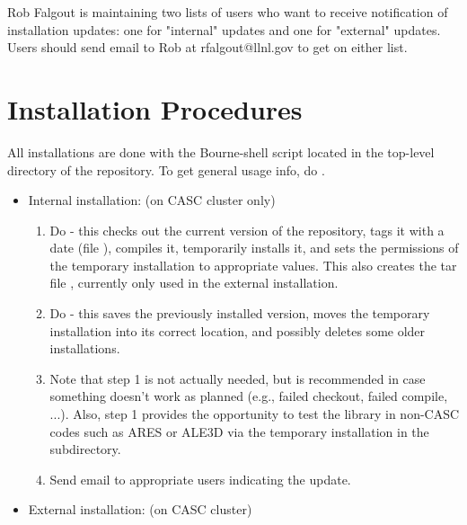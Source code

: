 Rob Falgout is maintaining two lists of users who want to receive
notification of installation updates: one for "internal" updates and
one for "external" updates.  Users should send email to Rob at
rfalgout@llnl.gov to get on either list.

\section{Installation Procedures}
\label{Installation Procedures}

All installations are done with the  Bourne-shell script
located in the top-level directory of the \hypre{} repository.  To
get general usage info, do .
\begin{itemize}

\item Internal installation: (on CASC cluster only)
\begin{enumerate}

   \item Do  - this checks out the current
   version of the repository, tags it with a date (file
   ), compiles it, temporarily installs it, and
   sets the permissions of the temporary installation to appropriate
   values.  This also creates the tar file ,
   currently only used in the external installation.
  
   \item Do  - this saves the previously
   installed version, moves the temporary installation into its
   correct location, and possibly deletes some older installations.
  
   \item Note that step 1 is not actually needed, but is recommended in case
   something doesn't work as planned (e.g., failed checkout, failed
   compile, ...).  Also, step 1 provides the opportunity to test the
   library in non-CASC codes such as ARES or ALE3D via the temporary
   installation in the  subdirectory.
  
   \item Send email to appropriate users indicating the update.

\end{enumerate}

\item External installation: (on CASC cluster)
\begin{enumerate}


\end{enumerate}
\end{itemize}
